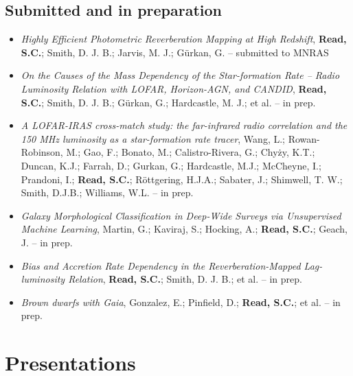 \documentclass[letterpaper]{twentysecondcv} %
\begin{document}
\subsection{Submitted and in preparation}
\begin{itemize}
     \item \textit{Highly Efficient Photometric Reverberation Mapping at High Redshift}, \textbf{Read, S.C.}; Smith, D. J. B.; Jarvis, M. J.; Gürkan, G. -- submitted to MNRAS\\
 \item \textit{On the Causes of the Mass Dependency of the Star-formation Rate -- Radio
Luminosity Relation with LOFAR, Horizon-AGN, and CANDID}, \textbf{Read, S.C.}; Smith, D. J. B.; Gürkan, G.; Hardcastle, M. J.; et
al. -- in prep.\\
 \item \textit{A LOFAR-IRAS cross-match study: the far-infrared radio correlation and
the 150 MHz luminosity as a star-formation rate tracer}, Wang, L.; Rowan-Robinson, M.; Gao, F.; Bonato, M.; Calistro-Rivera, G.;
Chyży, K.T.; Duncan, K.J.; Farrah, D.; Gurkan, G.; Hardcastle, M.J.;
McCheyne, I.; Prandoni, I.; \textbf{Read, S.C.}; Röttgering, H.J.A.;
Sabater, J.; Shimwell, T. W.; Smith, D.J.B.; Williams, W.L. -- in prep.\\
 \item \textit{Galaxy Morphological Classification in Deep-Wide Surveys via
Unsupervised Machine Learning}, Martin, G.; Kaviraj, S.; Hocking, A.; \textbf{Read, S.C.}; Geach, J. -- in prep.\\
 \item \textit{Bias and Accretion Rate Dependency in the Reverberation-Mapped
Lag-luminosity Relation}, \textbf{Read, S.C.}; Smith, D. J. B.; et al. -- in prep.\\
 \item \textit{Brown dwarfs with Gaia}, Gonzalez, E.; Pinfield, D.; \textbf{Read, S.C.}; et al. -- in prep.\\
\end{itemize}

\section{Presentations}
\begin{twenty}
     \\
 \\
 \\
 \\
\end{twenty}
\end{document}
